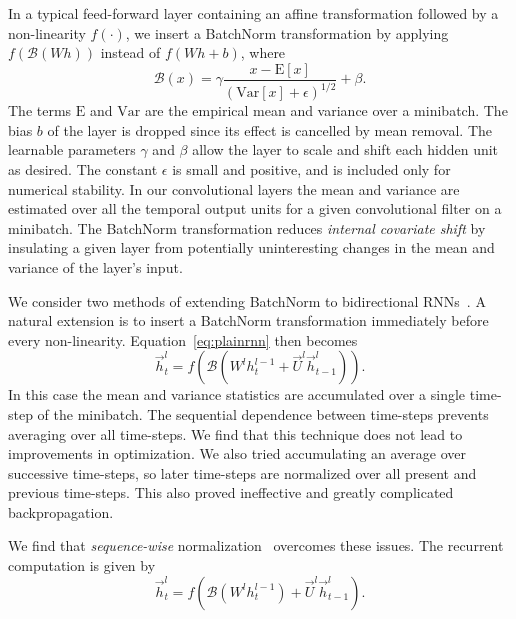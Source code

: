 \documentclass{article}
\begin{document}
In a typical feed-forward layer containing an affine transformation followed by a non-linearity $f(\cdot)$, we insert a BatchNorm transformation by applying $f(\mathcal{B}(Wh))$ instead of $f(Wh + b)$, where
\begin{equation}
    \mathcal{B}(x) = \gamma \frac{x - \mathrm{E}[x]}{\left(\mathrm{Var}[x] + \epsilon\right)^{1/2}} + \beta.
\end{equation}
The terms $\mathrm{E}$ and $\mathrm{Var}$ are the empirical mean and variance over a minibatch. The bias $b$ of the layer is dropped since its effect is cancelled by mean removal. The learnable parameters $\gamma$ and $\beta$ allow the layer to scale and shift each hidden unit as desired. The constant $\epsilon$ is small and positive, and is included only for numerical stability. In our convolutional layers the mean and variance are estimated over all the temporal output units for a given convolutional filter on a minibatch. The BatchNorm transformation reduces \emph{internal covariate shift} by insulating a given layer from potentially uninteresting changes in the mean and variance of the layer's input.

We consider two methods of extending BatchNorm to bidirectional RNNs~\cite{laurent2015}. A natural extension is to insert a BatchNorm transformation immediately before every non-linearity. Equation~\ref{eq:plainrnn} then becomes 
\begin{equation}
    \overrightarrow{h}^l_t = f( \mathcal{B}( W^l h^{l-1}_t + \overrightarrow{U}^l \overrightarrow{h}^l_{t-1} )).  
\end{equation}
In this case the mean and variance statistics are accumulated over a single time-step of the minibatch. The sequential dependence between time-steps prevents averaging over all time-steps. We find that this technique does not lead to improvements in optimization. We also tried accumulating an average over successive time-steps, so later time-steps are normalized over all present and previous time-steps. This also proved ineffective and greatly complicated backpropagation.

We find that \emph{sequence-wise} normalization~\cite{laurent2015} overcomes these issues. The recurrent computation is given by
\begin{equation}
    \overrightarrow{h}^l_t = f( \mathcal{B}( W^l h^{l-1}_t) + \overrightarrow{U}^l \overrightarrow{h}^l_{t-1}).  
\end{equation}
\end{document}
